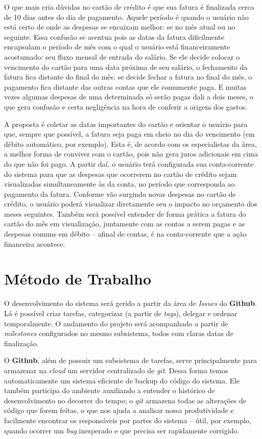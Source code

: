 \documentclass[a4paper]{abnt}
\begin{document}
O que mais cria dúvidas no cartão de crédito é que sua fatura é finalizada cerca de 10 dias antes do dia de pagamento. Aquele período é quando o usuário não está certo de onde as despesas se encaixam melhor: se no mês atual ou no seguinte. Essa confusão se acentua pois as datas da fatura dificilmente encapsulam o período de mês com o qual o usuário está financeiramente acostumado: seu fluxo mensal de entrada do salário. Se ele decide colocar o vencimento do cartão para uma data próxima de seu salário, o fechamento da fatura fica distante do final do mês; se decide fechar a fatura no final do mês, o pagamento fica distante das outras contas que ele comumente paga. E muitas vezes algumas despesas de uma determinada só serão pagas dali a dois meses, o que gera confusão e certa negligência na hora de conferir a origem dos gastos.

A proposta é coletar as datas importantes do cartão e orientar o usuário para que, sempre que possível, a fatura seja paga em cheio no dia do vencimento (em débito automático, por exemplo). Esta é, de acordo com os especialistas da área, a melhor forma de conviver com o cartão, pois não gera juros adicionais em cima do que não foi pago. A partir daí, o usuário terá configurada sua conta-corrente do sistema para que as despesas que ocorrerem no cartão de crédito sejam visualizadas simultaneamente às da conta, no período que corresponda ao pagamento da fatura. Conforme vão surgindo novas despesas no cartão de crédito, o usuário poderá visualizar diretamente seu o impacto no orçamento dos meses seguintes. Também será possível entender de forma prática a fatura do cartão do mês em visualização, juntamente com as contas a serem pagas e as despesas comuns em débito -- afinal de contas, é na conta-corrente que a ação financeira acontece.

\section{Método de Trabalho}
O desenvolvimento do sistema será gerido a partir da área de \emph{Issues} do \textbf{Github}. Lá é possível criar tarefas, categorizar (a partir de \emph{tags}), delegar e ordenar temporalmente. O andamento do projeto será acompanhado a partir de \emph{milestones} configurados no mesmo subsistema, todos com claras datas de finalização.

O \textbf{Github}, além de possuir um subsistema de tarefas, serve principalmente para armazenar na \emph{cloud} um servidor centralizado de \emph{git}. Dessa forma temos automaticamente um sistema eficiente de backup do código do sistema. Ele também participa do ambiente auxiliando a entender o histórico de desenvolvimento no decorrer do tempo; o \emph{git} armazena todas as alterações de código que forem feitas, o que nos ajuda a analisar nossa produtividade e facilmente encontrar os responsáveis por partes do sistema -- útil, por exemplo, quando ocorrer um \emph{bug} inesperado e que precisa ser rapidamente corrigido.
\end{document}
